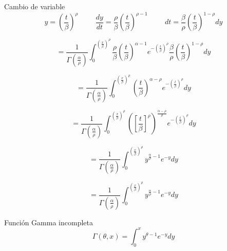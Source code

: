 \begin{frame}
    \begin{block}{Cambio de variable}
        \begin{equation*}
            y = \left( \frac{t}{\beta} \right)^\rho
            \hspace{1cm}
            \frac{dy}{dt} = \frac{\rho}{\beta} \left( \frac{t}{\beta} \right)^{\rho-1}
            \hspace{1cm}
            {dt} = \frac{\beta}{\rho} \left( \frac{t}{\beta} \right)^{1-\rho} dy
        \end{equation*}
    \end{block}

    \begin{equation*}
        = \frac{1}{\Gamma \left( \frac{\alpha}{\rho} \right)}\int_{0}^{\left( \frac{x}{\beta} \right)^\rho}
          \frac{\rho}{\beta} \left( \frac{t}{\beta} \right) ^{\alpha - 1} e^{-\left(\frac{t}{\beta}\right)^{\rho}} \frac{\beta}{\rho} \left( \frac{t}{\beta} \right)^{1-\rho} dy
    \end{equation*}

    \begin{equation*}
        = \frac{1}{\Gamma \left( \frac{\alpha}{\rho} \right)}\int_{0}^{\left( \frac{x}{\beta} \right)^\rho}
          \left( \frac{t}{\beta} \right) ^{\alpha - \rho} e^{-\left(\frac{t}{\beta}\right)^{\rho}} dy
    \end{equation*}

    \begin{equation*}
        = \frac{1}{\Gamma \left( \frac{\alpha}{\rho} \right)}\int_{0}^{\left( \frac{x}{\beta} \right)^\rho}
          \left( \left[ \frac{t}{\beta} \right]^\rho \right) ^{\frac{\alpha - \rho}{\rho}} e^{-\left(\frac{t}{\beta}\right)^{\rho}} dy
    \end{equation*}
\end{frame}

\begin{frame}
    \begin{equation*}
        = \frac{1}{\Gamma \left( \frac{\alpha}{\rho} \right)}\int_{0}^{\left( \frac{x}{\beta} \right)^\rho} y^{\frac{\alpha}{\rho} - 1} e^{-y} dy
    \end{equation*}
\end{frame}

\begin{frame}
    \begin{equation*}
        = \frac{1}{\Gamma \left( \frac{\alpha}{\rho} \right)}\int_{0}^{\left( \frac{x}{\beta} \right)^\rho} y^{\frac{\alpha}{\rho} - 1} e^{-y} dy
    \end{equation*}

    \begin{block}{Función Gamma incompleta}
        \begin{equation*}
            \Gamma(\theta, x) = \int_{0}^{x} y^{\theta - 1} e^{-y} dy
        \end{equation*}
    \end{block}
\end{frame}

